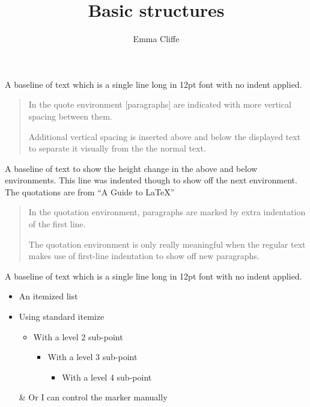 \newtheorem{theorem}{Theorem}[section]
\usepackage{longtable} 
\title{Basic structures}
\author{Emma Cliffe}
\date{}
\usepackage{calc}
\usepackage{longtable}
\usepackage{tabu}
\usepackage{breqn}
\setlength{\arraycolsep}{0.800000em}
\renewcommand{\arraystretch}{1.400000}

\renewcommand{\baselinestretch}{1.250000}
\selectfont
\setlength{\parskip}{1.0\baselineskip}


\maketitle
\noindent
A baseline of text which is a single line long in 12pt font with no indent applied.

\begin{quote}
In the quote environment [paragraphs] are indicated with more vertical spacing between them. 

Additional vertical spacing is inserted above and below the displayed text to separate it visually from the the normal text.
\end{quote}

A baseline of text to show the height change in the above and below environments. This line was indented though to show off the next environment. The quotations are from ``A Guide to \LaTeX'' \cite{KopkaDaly}

\begin{quotation}
In the quotation environment, paragraphs are marked by extra indentation of the first line. 

The quotation environment is only really meaningful when the regular text makes use of first-line indentation to show off new paragraphs.
\end{quotation}


\noindent
A baseline of text which is a single line long in 12pt font with no indent applied.

\begin{itemize}
\item An itemized list
\item Using standard itemize
\begin{itemize}
\item With a level 2 sub-point
\begin{itemize}
\item With a level 3 sub-point
\begin{itemize}
\item With a level 4 sub-point
\end{itemize}
\end{itemize}
\end{itemize}
\item[\&] Or I can control the marker manually
\end{itemize}

